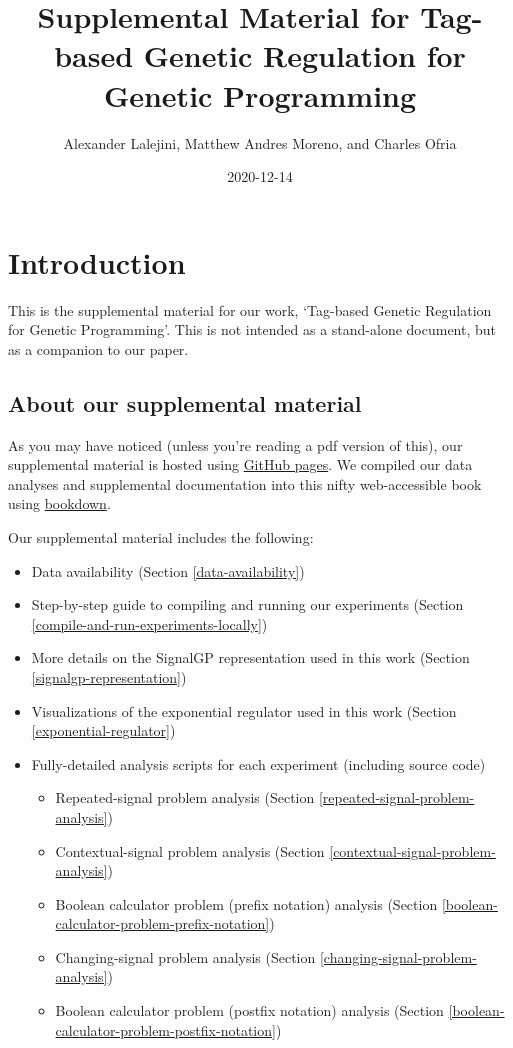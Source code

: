 \documentclass[
]{book}
\title{Supplemental Material for Tag-based Genetic Regulation for Genetic Programming}
\author{Alexander Lalejini, Matthew Andres Moreno, and Charles Ofria}
\date{2020-12-14}
\providecommand{\tightlist}{%
  \setlength{\itemsep}{0pt}\setlength{\parskip}{0pt}}
\begin{document}
\maketitle

{
\setcounter{tocdepth}{1}
\tableofcontents
}
\hypertarget{introduction}{%
\chapter{Introduction}\label{introduction}}

This is the supplemental material for our work, `Tag-based Genetic Regulation for Genetic Programming'.
This is not intended as a stand-alone document, but as a companion to our paper.

\hypertarget{about-our-supplemental-material}{%
\section{About our supplemental material}\label{about-our-supplemental-material}}

As you may have noticed (unless you're reading a pdf version of this), our supplemental material is hosted using \href{https://pages.github.com/}{GitHub pages}.
We compiled our data analyses and supplemental documentation into this nifty web-accessible book using \href{https://bookdown.org}{bookdown}.

Our supplemental material includes the following:

\begin{itemize}
\tightlist
\item
  Data availability (Section \ref{data-availability})
\item
  Step-by-step guide to compiling and running our experiments (Section \ref{compile-and-run-experiments-locally})
\item
  More details on the SignalGP representation used in this work (Section \ref{signalgp-representation})
\item
  Visualizations of the exponential regulator used in this work (Section \ref{exponential-regulator})
\item
  Fully-detailed analysis scripts for each experiment (including source code)

  \begin{itemize}
  \tightlist
  \item
    Repeated-signal problem analysis (Section \ref{repeated-signal-problem-analysis})
  \item
    Contextual-signal problem analysis (Section \ref{contextual-signal-problem-analysis})
  \item
    Boolean calculator problem (prefix notation) analysis (Section \ref{boolean-calculator-problem-prefix-notation})
  \item
    Changing-signal problem analysis (Section \ref{changing-signal-problem-analysis})
  \item
    Boolean calculator problem (postfix notation) analysis (Section \ref{boolean-calculator-problem-postfix-notation})
  \end{itemize}
\end{itemize}
\end{document}
